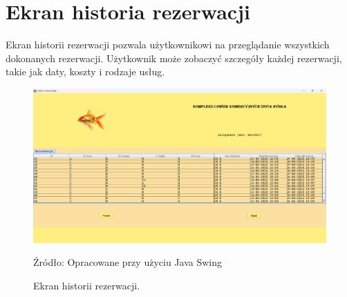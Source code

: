 \section{Ekran historia rezerwacji}
Ekran historii rezerwacji pozwala użytkownikowi na przeglądanie wszystkich dokonanych rezerwacji. Użytkownik może zobaczyć szczegóły każdej rezerwacji, takie jak daty, koszty i rodzaje usług.
\begin{figure}[H]
    \centering
    \includegraphics[width=0.8\linewidth]{figures/history.eps}
    \caption{Ekran historii rezerwacji.}
    \label{fig:history_screen}
    \small{Źródło: Opracowane przy użyciu Java Swing}
\end{figure}
\clearpage


